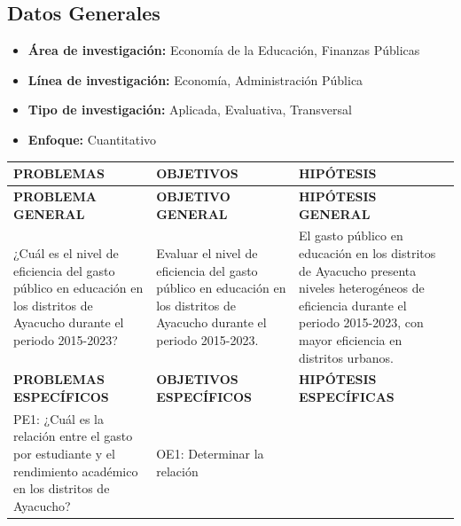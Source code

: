 \documentclass[
  man,
  floatsintext,
  longtable,
  a4paper,
  nolmodern,
  notxfonts,
  notimes,
  12pt,
  colorlinks=true,linkcolor=blue,citecolor=blue,urlcolor=blue]{apa7}
\providecommand{\tightlist}{%
  \setlength{\itemsep}{0pt}\setlength{\parskip}{0pt}}
\newcounter{none} %
\begin{document}
\subsection{Datos Generales}\label{datos-generales-2}

\begin{itemize}
\tightlist
\item
  \textbf{Área de investigación:} Economía de la Educación, Finanzas
  Públicas
\item
  \textbf{Línea de investigación:} Economía, Administración Pública
\item
  \textbf{Tipo de investigación:} Aplicada, Evaluativa, Transversal
\item
  \textbf{Enfoque:} Cuantitativo
\end{itemize}

{\def\LTcaptype{none} %
\begin{longtable}[]{@{}
  >{\raggedright\arraybackslash}p{}
  >{\raggedright\arraybackslash}p{}
  >{\raggedright\arraybackslash}p{}@{}}
\toprule\noalign{}
\begin{minipage}[b]{\linewidth}\raggedright
PROBLEMAS
\end{minipage} & \begin{minipage}[b]{\linewidth}\raggedright
OBJETIVOS
\end{minipage} & \begin{minipage}[b]{\linewidth}\raggedright
HIPÓTESIS
\end{minipage} \\
\midrule\noalign{}
\endhead
\bottomrule\noalign{}
\endlastfoot
\textbf{PROBLEMA GENERAL} & \textbf{OBJETIVO GENERAL} &
\textbf{HIPÓTESIS GENERAL} \\
¿Cuál es el nivel de eficiencia del gasto público en educación en los
distritos de Ayacucho durante el periodo 2015-2023? & Evaluar el nivel
de eficiencia del gasto público en educación en los distritos de
Ayacucho durante el periodo 2015-2023. & El gasto público en educación
en los distritos de Ayacucho presenta niveles heterogéneos de eficiencia
durante el periodo 2015-2023, con mayor eficiencia en distritos
urbanos. \\
\textbf{PROBLEMAS ESPECÍFICOS} & \textbf{OBJETIVOS ESPECÍFICOS} &
\textbf{HIPÓTESIS ESPECÍFICAS} \\
PE1: ¿Cuál es la relación entre el gasto por estudiante y el rendimiento
académico en los distritos de Ayacucho? & OE1: Determinar la relación

\end{longtable}}
\end{document}
